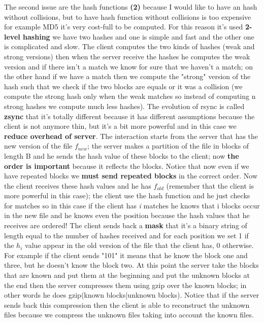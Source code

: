 The second issue are the hash functions \textbf{(2)} because I would like to have an hash without collisions, but to have hash function without collisions is too expensive for example MD5 it's very cost-full to be computed. For this reason it's used \textbf{2-level hashing} we have two hashes and one is simple and fast and the other one is complicated and slow. The client computes the two kinds of hashes (weak and strong versions) then when the server receive the hashes he computes the weak version and if there isn't a match we know for sure that we haven't a match; on the other hand if we have a match then we compute the "strong" version of the hash such that we check if the two blocks are equals or it was a collision (we compute the strong hash only when the weak matches so instead of computing n strong hashes we compute much less hashes).\newline
The evolution of rsync is called \textbf{zsync} that it's totally different because it has different assumptions because the client is not anymore thin, but it's a bit more powerful and in this case we \textbf{reduce overhead of server}.\newline
The interaction starts from the server that has the new version of the file $f_{new}$; the server makes a partition of the file in blocks of length B and he sends the hash value of these blocks to the client; now \textbf{the order is important} because it reflects the blocks. Notice that now even if we have repeated blocks we \textbf{must send repeated blocks} in the correct order.\newline
Now the client receives these hash values and he has $f_{old}$ (remember that the client is more powerful in this case); the client use the hash function and he just checks for matches so in this case if the client has \textit{i} matches he knows that i blocks occur in the new file and he knows even the position because the hash values that he receives are ordered! The client sends back a \textbf{mask} that it's a binary string of length equal to the number of hashes received and for each position we set 1 if the $h_i$ value appear in the old version of the file that the client has, 0 otherwise. For example if the client sends "101" it means that he know the block one and three, but he doesn't know the block two.\newline
At this point the server take the blocks that are known and put them at the beginning and put the unknown blocks at the end then the server compresses them using gzip over the known blocks; in other words he does gzip(known blocks|unknown blocks). Notice that if the server sends back this compression then the client is able to reconstruct the unknown files because we compress the unknown files taking into account the known files.\newline
